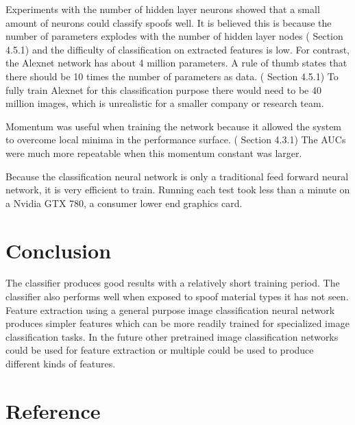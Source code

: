 \documentclass[]{article}
\begin{document}
Experiments with the number of hidden layer neurons showed that a small amount of neurons could classify spoofs well. It is believed this is because the number of parameters explodes with the number of hidden layer nodes (\cite{book} Section 4.5.1) and the difficulty of classification on extracted features is low. For contrast, the Alexnet network has about 4 million parameters. A rule of thumb states that there should be 10 times the number of parameters as data. (\cite{book} Section 4.5.1) To fully train Alexnet for this classification purpose there would need to be 40 million images, which is unrealistic for a smaller company or research team. 

Momentum was useful when training the network because it allowed the system to overcome local minima in the performance surface. (\cite{book} Section 4.3.1) The AUCs were much more repeatable when this momentum constant was larger.

Because the classification neural network is only a traditional feed forward neural network, it is very efficient to train. Running each test took less than a minute on a Nvidia GTX 780, a consumer lower end graphics card. 
\section{Conclusion}

The classifier produces good results with a relatively short training period. The classifier also performs well when exposed to spoof material types it has not seen. Feature extraction using a general purpose image classification neural network produces simpler features which can be more readily trained for specialized image classification tasks. In the future other pretrained image classification networks could be used for feature extraction or multiple could be used to produce different kinds of features. 

\section{Reference}


\end{document}

